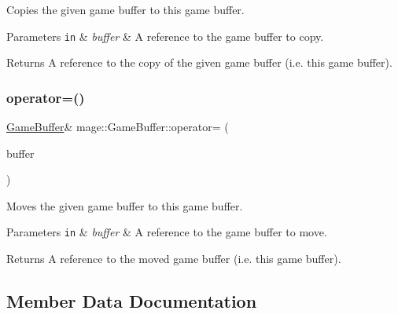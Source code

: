 Copies the given game buffer to this game buffer.


\begin{DoxyParams}[1]{Parameters}
\mbox{\tt in}  & {\em buffer} & A reference to the game buffer to copy. \\
\hline
\end{DoxyParams}
\begin{DoxyReturn}{Returns}
A reference to the copy of the given game buffer (i.\+e. this game buffer). 
\end{DoxyReturn}
\hypertarget{structmage_1_1_game_buffer_af699a10b932a9f766acb990edefa03a5}{}\label{structmage_1_1_game_buffer_af699a10b932a9f766acb990edefa03a5} 
\subsubsection{\texorpdfstring{operator=()}{operator=()}\hspace{0.1cm}{\footnotesize\ttfamily [2/2]}}
{\footnotesize\ttfamily \hyperlink{structmage_1_1_game_buffer}{Game\+Buffer}\& mage\+::\+Game\+Buffer\+::operator= (\begin{DoxyParamCaption}\item[{\hyperlink{structmage_1_1_game_buffer}{Game\+Buffer} \&\&}]{buffer }\end{DoxyParamCaption})\hspace{0.3cm}{\ttfamily [default]}}

Moves the given game buffer to this game buffer.


\begin{DoxyParams}[1]{Parameters}
\mbox{\tt in}  & {\em buffer} & A reference to the game buffer to move. \\
\hline
\end{DoxyParams}
\begin{DoxyReturn}{Returns}
A reference to the moved game buffer (i.\+e. this game buffer). 
\end{DoxyReturn}


\subsection{Member Data Documentation}
\hypertarget{structmage_1_1_game_buffer_aa0c2404e00aa5ab13965e5ca5ba92451}{}\label{structmage_1_1_game_buffer_aa0c2404e00aa5ab13965e5ca5ba92451} 
